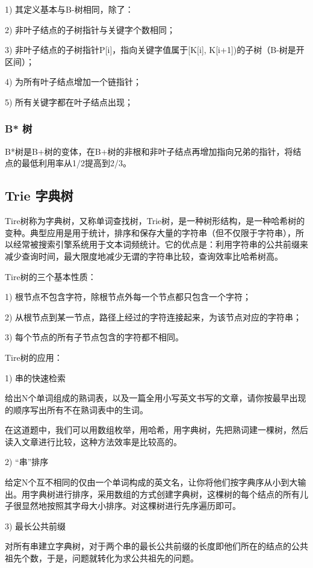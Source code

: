\documentclass[UTF8,a4paper,12pt]{ctexbook}
\begin{document}
			1) 其定义基本与B-树相同，除了：
			
			2) 非叶子结点的子树指针与关键字个数相同；
			
			3) 非叶子结点的子树指针P[i]，指向关键字值属于[K[i], K[i+1])的子树（B-树是开区间）；
			
			4) 为所有叶子结点增加一个链指针；
			
			5) 所有关键字都在叶子结点出现；
			
		\subsubsection{B* 树}
			B*树是B+树的变体，在B+树的非根和非叶子结点再增加指向兄弟的指针，将结点的最低利用率从1/2提高到2/3。
		
	\subsection{Trie 字典树}	
		Tire树称为字典树，又称单词查找树，Trie树，是一种树形结构，是一种哈希树的变种。典型应用是用于统计，排序和保存大量的字符串（但不仅限于字符串），所以经常被搜索引擎系统用于文本词频统计。它的优点是：利用字符串的公共前缀来减少查询时间，最大限度地减少无谓的字符串比较，查询效率比哈希树高。　
		
		Tire树的三个基本性质：
		
		1) 根节点不包含字符，除根节点外每一个节点都只包含一个字符； 
		
		2) 从根节点到某一节点，路径上经过的字符连接起来，为该节点对应的字符串； 
		
		3) 每个节点的所有子节点包含的字符都不相同。
		
		Tire树的应用：
		
		1) 串的快速检索
		
		给出N个单词组成的熟词表，以及一篇全用小写英文书写的文章，请你按最早出现的顺序写出所有不在熟词表中的生词。
		
		在这道题中，我们可以用数组枚举，用哈希，用字典树，先把熟词建一棵树，然后读入文章进行比较，这种方法效率是比较高的。
		
		2) “串”排序
		
		给定N个互不相同的仅由一个单词构成的英文名，让你将他们按字典序从小到大输出。用字典树进行排序，采用数组的方式创建字典树，这棵树的每个结点的所有儿子很显然地按照其字母大小排序。对这棵树进行先序遍历即可。
		
		3) 最长公共前缀
		
		对所有串建立字典树，对于两个串的最长公共前缀的长度即他们所在的结点的公共祖先个数，于是，问题就转化为求公共祖先的问题。
\end{document}
